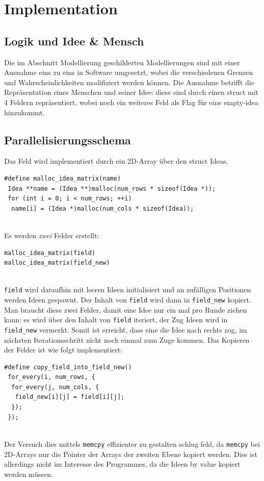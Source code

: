 \section{Implementation}
\subsection{Logik und Idee \& Mensch}
Die im Abschnitt Modellierung geschilderten Modellierungen sind mit einer Ausnahme eins zu eins in Software umgesetzt, wobei die verschiedenen Grenzen und Wahrscheinlichkeiten modifiziert werden können. Die Ausnahme betrifft die Repräsentation eines Menschen und seiner Idee: diese sind durch einen struct mit 4 Feldern repräsentiert, wobei noch ein weiteres Feld als Flag für eine empty-idea hinzukommt.

\subsection{Parallelisierungsschema}
Das Feld wird implementiert durch ein 2D-Array über den struct Ideas.

\begin{verbatim}
#define malloc_idea_matrix(name)
 Idea **name = (Idea **)malloc(num_rows * sizeof(Idea *));
 for (int i = 0; i < num_rows; ++i)
  name[i] = (Idea *)malloc(num_cols * sizeof(Idea));
\end{verbatim}
\quad \\
Es werden \textit{zwei} Felder erstellt:

\begin{verbatim}
malloc_idea_matrix(field)
malloc_idea_matrix(field_new)
\end{verbatim}
\quad \\
\texttt{field} wird daraufhin mit leeren Ideen initialisiert und an zufälligen Positionen werden Ideen gespawnt.
Der Inhalt von \texttt{field} wird dann in \texttt{field\_new} kopiert.
Man braucht diese zwei Felder, damit eine Idee nur ein mal pro Runde ziehen kann:
es wird über den Inhalt von \texttt{field} iteriert, der Zug Ideen wird in \texttt{field\_new} vermerkt.
Somit ist erreicht, dass eine die Idee nach rechts zog, im nächsten Iterationsschritt nicht noch einmal zum Zuge kommen.
Das Kopieren der Felder ist wie folgt implementiert:

\begin{verbatim}
#define copy_field_into_field_new()
 for_every(i, num_rows, {
  for_every(j, num_cols, {
   field_new[i][j] = field[i][j];
  });
 });
\end{verbatim}
\quad \\
Der Versuch dies mittels \texttt{memcpy} effizienter zu gestalten schlug fehl, da \texttt{memcpy} bei 2D-Arrays nur die Pointer der Arrays der zweiten Ebene kopiert werden.
Dies ist allerdings nicht im Interesse des Programmes, da die Ideen by value kopiert werden müssen. \\

